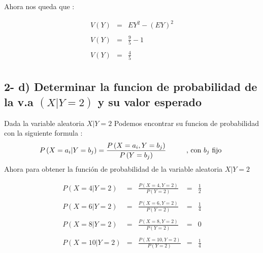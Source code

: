 \documentclass[12pt]{article}
\begin{document}
Ahora nos queda que :

\begin{equation*}
    \begin{array}{rcl}
        V\left(Y\right) & = & EY^2 - \left(EY\right)^2
        \\
        \\
        V\left(Y\right) & = & \displaystyle \frac{9}{5} - 1
        \\
        \\
        V\left(Y\right) & = & \displaystyle \frac{4}{5}
        \\
    \end{array}
\end{equation*}

\subsection*{2- d) Determinar la funcion de probabilidad de la v.a $\left(X|Y = 2\right)$ y su valor esperado }

\begin{flushleft}
    Dada la variable aleatoria $ X | Y = 2 $ Podemos encontrar su funcion de probabilidad con la siguiente formula :
    \begin{equation*}
        P \left(X = a_i | Y = b_j\right) = \frac{P\left(X = a_i , Y = b_j\right)}{P \left(Y = b_j\right)}
        \hspace*{1cm}
        \mbox{, con $b_j$  fijo }
    \end{equation*}
    Ahora para obtener la funci\'on de probabilidad de la variable aleatoria $ X|Y =2$
\end{flushleft}

\begin{equation*}
    \begin{array}{rcccc}
        P\left(X = 4 | Y =2 \right)  & = & \displaystyle \frac{P\left(X=4 , Y=2\right)}{P\left(Y =2\right)}  & = & \displaystyle \frac{1}{2}
        \\
        \\
        P\left(X = 6 | Y =2 \right)  & = & \displaystyle \frac{P\left(X=6 , Y=2\right)}{P\left(Y =2\right)}  & = & \displaystyle \frac{1}{4}
        \\
        \\
        P\left(X = 8 | Y =2 \right)  & = & \displaystyle \frac{P\left(X=8 , Y=2\right)}{P\left(Y =2\right)}  & = & 0
        \\
        \\
        P\left(X = 10 | Y =2 \right) & = & \displaystyle \frac{P\left(X=10 , Y=2\right)}{P\left(Y =2\right)} & = & \displaystyle \frac{1}{4}
    \end{array}
\end{equation*}
\end{document}
